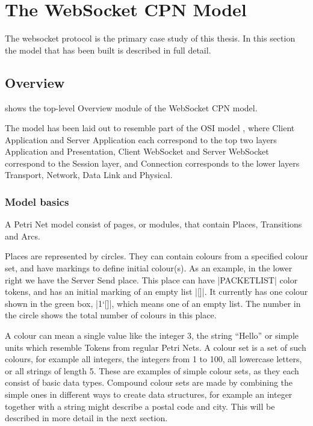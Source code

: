 \section{The WebSocket CPN Model}

The websocket protocol is the primary case study of this thesis. 
In this section the model that has been built is described in full detail.

\subsection{Overview}

	
	 shows the top-level Overview module of the WebSocket
	CPN model.
	
	The model has been laid out to resemble part of the OSI model \cite{osi7}, where
	Client Application and Server Application each correspond to the top two
	layers Application and Presentation, Client WebSocket and Server WebSocket
	correspond to the Session layer, and Connection corresponds to the lower layers
	Transport, Network, Data Link and Physical.
	
	\subsubsection{Model basics}
	A Petri Net model consist of pages, or modules, that contain Places,
	Transitions and Arcs.
	
	Places are represented by circles. They can contain colours from a specified
	colour set, and have markings to define initial colour(s).  As an example, in
	the lower right we have the Server Send place. This place can have
	|PACKETLIST| color tokens, and has an initial marking of an empty
	list |[]|. It currently has one colour shown in the green box,
	|1`[]|, which means one of an empty list. The number in the circle
	shows the total number of colours in this place.
	
	A colour can mean a single value like the integer 3, the string ``Hello'' or
	simple units which resemble Tokens from regular Petri Nets. A colour set is a
	set of such colours, for example all integers, the integers from 1 to 100, all
	lowercase letters, or all strings of length 5. These are examples of simple
	colour sets, as they each consist of basic data types. Compound colour sets are
	made by combining the simple ones in different ways to create data structures, for
	example an integer together with a string might describe a postal code and
	city. This will be described in more detail in the next section.
	
